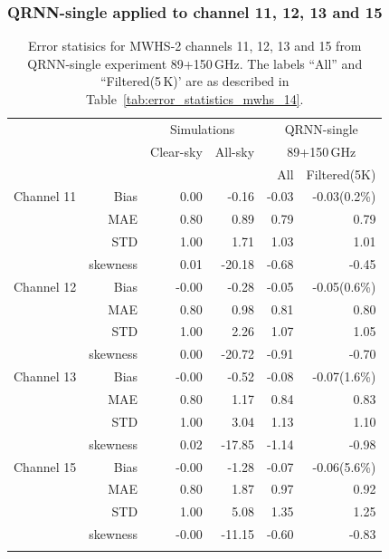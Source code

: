 \documentclass[amt, manuscript]{copernicus}
\begin{document}
\subsubsection{QRNN-single applied to channel 11, 12, 13 and 15}
\label{sec:mwhs_others}
\begin{table}[t]
	\caption{ Error statisics for MWHS-2 channels 11, 12, 13 and 15 from QRNN-single experiment 89+150\,GHz. The labels ``All'' and ``Filtered(5\,K)' are as described in Table~\ref{tab:error_statistics_mwhs_14}.}
	\label{tab:error_statistics_mwhs_others}
	\begin{tabular}{lrrr|rr}
		\tophline
		&&\multicolumn{2}{c|}{Simulations}& \multicolumn{2}{c}{QRNN-single} \\
		\cline{2-6}
		& &  Clear-sky &   All-sky &  \multicolumn{2}{c}{89+150\,GHz}  \\
		&	&		   &			& All & Filtered(5K)\\
		\middlehline
		Channel 11  &   Bias      & 0.00 &  -0.16 & -0.03 & -0.03(0.2\%)  \\
				    &	MAE       & 0.80 &   0.89 &  0.79 &  0.79  \\
					&	STD       & 1.00 &   1.71 &  1.03 &  1.01  \\
					&	skewness & 0.01 & -20.18 & -0.68 & -0.45  \\
		\middlehline
		Channel 12  & Bias      & -0.00 &  -0.28 & -0.05 & -0.05(0.6\%)  \\
					& MAE       &  0.80 &   0.98 &  0.81 &  0.80  \\
					& STD       &  1.00 &   2.26 &  1.07 &  1.05  \\
					& skewness &  0.00 & -20.72 & -0.91 & -0.70  \\
		\middlehline
		Channel 13  & Bias      & -0.00 &  -0.52 & -0.08 & -0.07(1.6\%)  \\
					& MAE       &  0.80 &   1.17 &  0.84 &  0.83  \\
					& STD       &  1.00 &   3.04 &  1.13 &  1.10  \\
					& skewness &  0.02 & -17.85 & -1.14 & -0.98 \\		
		\middlehline
		Channel 15  & Bias      & -0.00 &  -1.28 & -0.07 & -0.06(5.6\%)  \\
					& MAE       &  0.80 &   1.87 &  0.97 &  0.92 \\
					& STD       &  1.00 &   5.08 &  1.35 &  1.25 \\
					& skewness & -0.00 & -11.15 & -0.60 & -0.83  \\ 
		\bottomhline
	\end{tabular}
\end{table}
\end{document}
